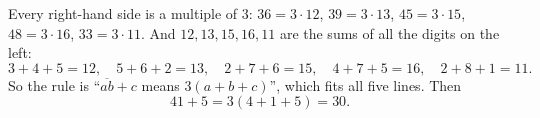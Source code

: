 Every right-hand side is a multiple of $3$: $36=3\cdot12$, $39=3\cdot13$, $45=3\cdot15$, $48=3\cdot16$, $33=3\cdot11$. And $12,13,15,16,11$ are the sums of all the digits on the left:
\[3+4+5=12,\quad5+6+2=13,\quad2+7+6=15,\quad4+7+5=16,\quad2+8+1=11.\]
So the rule is ``$\overline{ab}+c$ means $3(a+b+c)$'', which fits all five lines. Then
\[41+5=3(4+1+5)=\boxed{30}.\]
